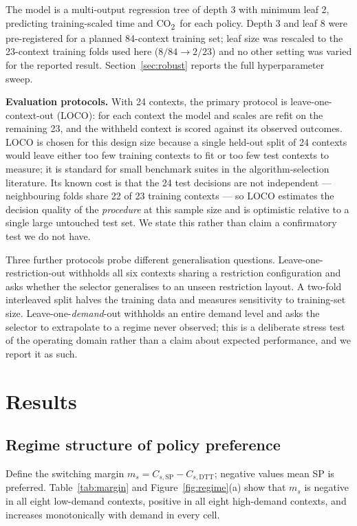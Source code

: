 \documentclass[10pt,a4paper]{article}
\newcommand{\CO}{CO\textsubscript{2}}
\begin{document}
The model is a multi-output regression tree \cite{R37} of depth 3 with minimum leaf 2, predicting training-scaled time and \CO\ for each policy. Depth 3 and leaf 8 were pre-registered for a planned 84-context training set; leaf size was rescaled to the 23-context training folds used here ($8/84\rightarrow2/23$) and no other setting was varied for the reported result. Section~\ref{sec:robust} reports the full hyperparameter sweep.

\textbf{Evaluation protocols.} With 24 contexts, the primary protocol is leave-one-context-out (LOCO): for each context the model and scales are refit on the remaining 23, and the withheld context is scored against its observed outcomes. LOCO is chosen for this design size because a single held-out split of 24 contexts would leave either too few training contexts to fit or too few test contexts to measure; it is standard for small benchmark suites in the algorithm-selection literature. Its known cost is that the 24 test decisions are not independent --- neighbouring folds share 22 of 23 training contexts --- so LOCO estimates the decision quality of the \emph{procedure} at this sample size and is optimistic relative to a single large untouched test set. We state this rather than claim a confirmatory test we do not have.

Three further protocols probe different generalisation questions. Leave-one-restriction-out withholds all six contexts sharing a restriction configuration and asks whether the selector generalises to an unseen restriction layout. A two-fold interleaved split halves the training data and measures sensitivity to training-set size. Leave-one-\emph{demand}-out withholds an entire demand level and asks the selector to extrapolate to a regime never observed; this is a deliberate stress test of the operating domain rather than a claim about expected performance, and we report it as such.

\section{Results}
\subsection{Regime structure of policy preference}\label{sec:regime}
Define the switching margin $m_s=C_{s,\mathrm{SP}}-C_{s,\mathrm{DTT}}$; negative values mean SP is preferred. Table~\ref{tab:margin} and Figure~\ref{fig:regime}(a) show that $m_s$ is negative in all eight low-demand contexts, positive in all eight high-demand contexts, and increases monotonically with demand in every cell.
\end{document}
